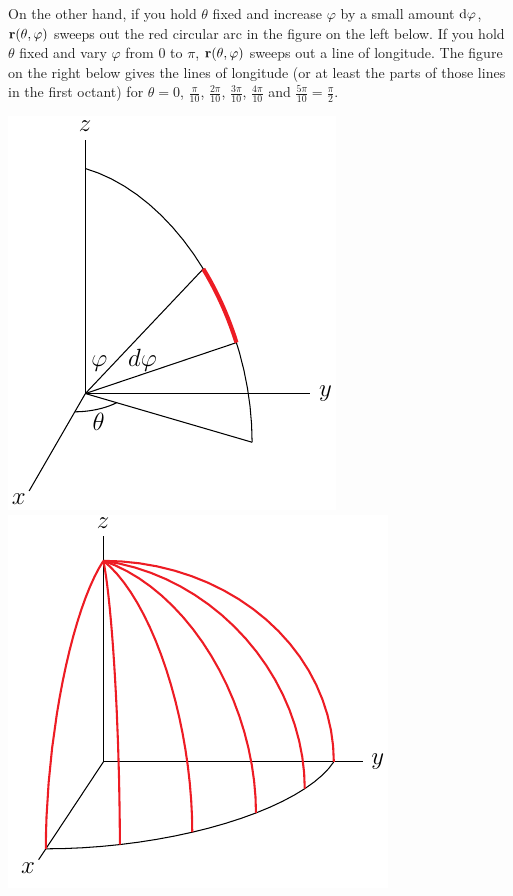 \begin{eg}[Sphere]
\begin{efig}
\begin{center}
\end{center}
\end{efig}
On the other hand, if you hold $\theta$ fixed and increase $\varphi$ 
by a small amount $\mathrm{d}\varphi$, $\mathbf{r}(\theta,\varphi)$ sweeps out the red circular 
arc in the figure on the left below. If you hold $\theta$ fixed  and vary 
$\varphi$ from $0$ to $\pi$, $\mathbf{r}(\theta,\varphi)$ sweeps out a line of longitude.
The figure on the right below gives the lines of longitude
(or at least the parts of those lines in the first octant) for 
$\theta=0$, $\frac{\pi}{10}$, $\frac{2\pi}{10}$, $\frac{3\pi}{10}$, 
$\frac{4\pi}{10}$ and $\frac{5\pi}{10}=\frac{\pi}{2}$.
\begin{efig}
\begin{center}
    \includegraphics[scale=1.05]{sphericalPhi.pdf}\qquad
    \includegraphics{sphericalLong.pdf}
\end{center}
\end{efig}
\end{eg}

